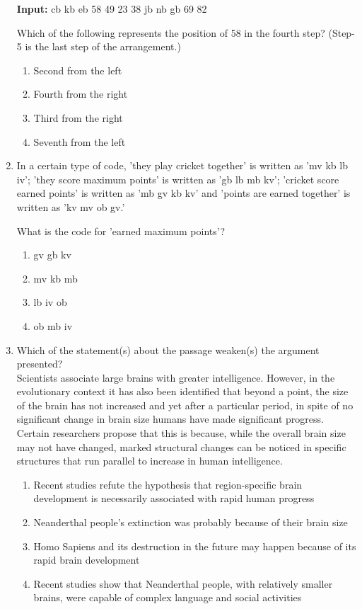 \documentclass[journal,12pt,onecolumn]{exam}
\theoremstyle{remark}
\begin{document}
\begin{enumerate}
\textbf{Input:} cb kb eb 58 49 23 38 jb nb gb 69 82

Which of the following represents the position of 58 in the fourth step? (Step-5 is the last step of the arrangement.)

\begin{enumerate}[label=(\Alph*)]
    \item Second from the left
    \item Fourth from the right
    \item Third from the right
    \item Seventh from the left
\end{enumerate}

\item In a certain type of code, 'they play cricket together' is written as 'mv kb lb iv';
'they score maximum points' is written as 'gb lb mb kv'; 'cricket score earned
points' is written as 'mb gv kb kv' and 'points are earned together' is written as
'kv mv ob gv.'

What is the code for 'earned maximum points'?

\begin{enumerate}[label=(\Alph*)]
    \item gv gb kv
    \item mv kb mb
    \item lb iv ob
    \item ob mb iv
\end{enumerate}
\newpage
\item Which of the statement(s) about the passage weaken(s) the argument presented?\\

Scientists associate large brains with greater intelligence. However, in the evolutionary context it has also been identified that beyond a point, the size of the brain has not increased and yet after a particular period, in spite of no significant change in brain size humans have made significant progress. Certain researchers propose that this is because, while the overall brain size may not have changed, marked structural changes can be noticed in specific structures that run parallel to increase in human intelligence.

\begin{enumerate}[label=(\Alph*)]
    \item Recent studies refute the hypothesis that region-specific brain development is necessarily associated with rapid human progress
    \item Neanderthal people's extinction was probably because of their brain size
    \item Homo Sapiens and its destruction in the future may happen because of its rapid brain development
    \item Recent studies show that Neanderthal people, with relatively smaller brains, were capable of complex language and social activities
\end{enumerate}


\end{enumerate}
\end{document}
